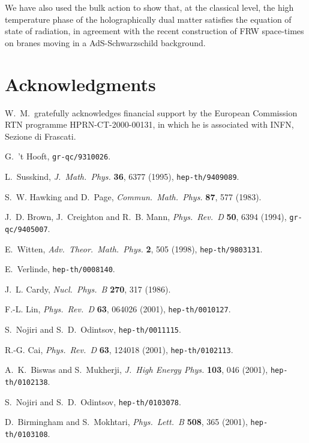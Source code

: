 \documentclass[a4paper,12pt]{article}
\begin{document}
We have also used the bulk action to show that, at the classical
level, the high temperature phase of the holographically dual matter
satisfies the equation of state of radiation, in agreement with the recent
construction of FRW space-times on branes moving in a AdS-Schwarzschild
background.

\section*{Acknowledgments}
W.~M.\ gratefully acknowledges financial support by the European
Commission RTN programme HPRN-CT-2000-00131, in which
he is associated with INFN, Sezione di Frascati.


\begin{thebibliography}{10}
\setlength{\itemsep}{0pt}
\raggedright
\renewcommand{\baselinestretch}{1}\normalfont

G.~{'t Hooft}, \texttt{gr-qc/9310026}.

L.~Susskind, \emph{J.~Math.~Phys.} \textbf{36}, 6377 (1995),
  \texttt{hep-th/9409089}.

S.~W. Hawking and D.~Page, \emph{Commun.~Math.~Phys.} \textbf{87}, 577 (1983).

J.~D. Brown, J.~Creighton and R.~B. Mann, \emph{Phys.~Rev.~D} \textbf{50}, 6394
  (1994), \texttt{gr-qc/9405007}.

E.~Witten, \emph{Adv.~Theor.~Math.~Phys.} \textbf{2}, 505 (1998),
  \texttt{hep-th/9803131}.

E.~Verlinde, \texttt{hep-th/0008140}.

J.~L. Cardy, \emph{Nucl.~Phys.~B} \textbf{270}, 317 (1986).

F.-L. Lin, \emph{Phys.~Rev.~D} \textbf{63}, 064026 (2001),
  \texttt{hep-th/0010127}.

S.~Nojiri and S.~D.~Odintsov,
\texttt{hep-th/0011115}.

R.-G. Cai, \emph{Phys.~Rev.~D} \textbf{63}, 124018 (2001),
  \texttt{hep-th/0102113}.

A.~K.~Biswas and S.~Mukherji,
 \emph{J.~High Energy Phys.} \textbf{103}, 046
  (2001), \texttt{hep-th/0102138}.

S.~Nojiri and S.~D.~Odintsov,
\texttt{hep-th/0103078}.

D.~Birmingham and S.~Mokhtari, \emph{Phys.~Lett.~B} \textbf{508}, 365 (2001),
  \texttt{hep-th/0103108}.


\end{thebibliography}
\end{document}
